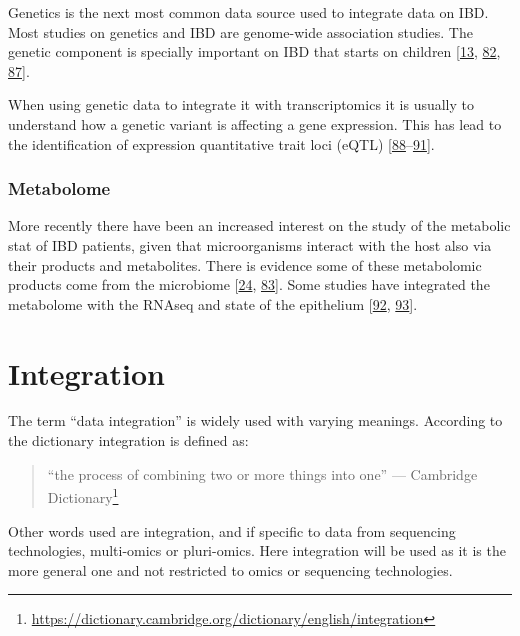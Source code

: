 \documentclass[
  a4paper,
]{book}
\DeclareRobustCommand{\href}[2]{#2\footnote{\url{#1}}}
\begin{document}
Genetics is the next most common data source used to integrate data on IBD.
Most studies on genetics and IBD are genome-wide association studies.
The genetic component is specially important on IBD that starts on children {[}\protect\hyperlink{ref-kumar2019}{13}, \protect\hyperlink{ref-huWholeExomeSequencing2021}{82}, \protect\hyperlink{ref-knights2013}{87}{]}.

When using genetic data to integrate it with transcriptomics it is usually to understand how a genetic variant is affecting a gene expression.
This has lead to the identification of expression quantitative trait loci (eQTL) {[}\protect\hyperlink{ref-repnik2016}{88}--\protect\hyperlink{ref-dai2019}{91}{]}.

\hypertarget{metabolome}{%
\subsubsection{Metabolome}\label{metabolome}}

More recently there have been an increased interest on the study of the metabolic stat of IBD patients, given that microorganisms interact with the host also via their products and metabolites.
There is evidence some of these metabolomic products come from the microbiome {[}\protect\hyperlink{ref-ferrer-picuxf3n2020}{24}, \protect\hyperlink{ref-mayorgas2021}{83}{]}.
Some studies have integrated the metabolome with the RNAseq and state of the epithelium {[}\protect\hyperlink{ref-ahmed2016}{92}, \protect\hyperlink{ref-gallagher2021}{93}{]}.

\hypertarget{integration}{%
\section{Integration}\label{integration}}

The term ``data integration'' is widely used with varying meanings.
According to the dictionary integration is defined as:

\begin{quote}
``the process of combining two or more things into one'' --- \href{https://dictionary.cambridge.org/dictionary/english/integration}{Cambridge Dictionary}
\end{quote}

Other words used are integration, and if specific to data from sequencing technologies, multi-omics or pluri-omics.
Here integration will be used as it is the more general one and not restricted to omics or sequencing technologies.
\end{document}
